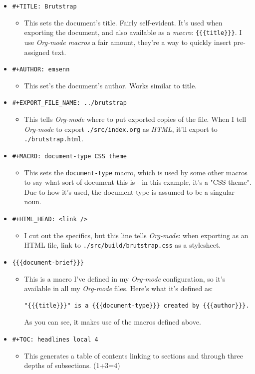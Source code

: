 \documentclass[11pt]{article}
\begin{document}
\begin{itemize}
\item \texttt{\#+TITLE: Brutstrap}
\begin{itemize}
\item This sets the document's title. Fairly self-evident. It's used
when exporting the document, and also available as a \emph{macro}:
\texttt{\{\{\{title\}\}\}}. I use \emph{Org-mode macros} a fair amount, they're a
way to quickly insert pre-assigned text.
\end{itemize}
\item \texttt{\#+AUTHOR: emsenn}
\begin{itemize}
\item This set's the document's author. Works similar to title.
\end{itemize}
\item \texttt{\#+EXPORT\_FILE\_NAME: ../brutstrap}
\begin{itemize}
\item This tells \emph{Org-mode} where to put exported copies of the file.
When I tell \emph{Org-mode} to export \texttt{./src/index.org} as \emph{HTML},
it'll export to \texttt{./brutstrap.html}.
\end{itemize}
\item \texttt{\#+MACRO: document-type CSS theme}
\begin{itemize}
\item This sets the \texttt{document-type} macro, which is used by some other
macros to say what sort of document this is - in this example,
it's a "CSS theme". Due to how it's used, the document-type is
assumed to be a singular noun.
\end{itemize}
\item \texttt{\#+HTML\_HEAD: <link />}
\begin{itemize}
\item I cut out the specifics, but this line tells \emph{Org-mode}: when
exporting as an HTML file, link to \texttt{./src/build/brutstrap.css} as
a stylesheet.
\end{itemize}
\item \texttt{\{\{\{document-brief\}\}\}}
\begin{itemize}
\item This is a macro I've defined in my \emph{Org-mode} configuration, so
it's available in all my \emph{Org-mode} files. Here's what it's
defined as:
\begin{verbatim}
"{{{title}}}" is a {{{document-type}}} created by {{{author}}}.
\end{verbatim}
As you can see, it makes use of the macros defined above.
\end{itemize}
\item \texttt{\#+TOC: headlines local 4}
\begin{itemize}
\item This generates a table of contents linking to sections and through
three depths of subsections. (1+3=4)
\end{itemize}
\end{itemize}
\end{document}
